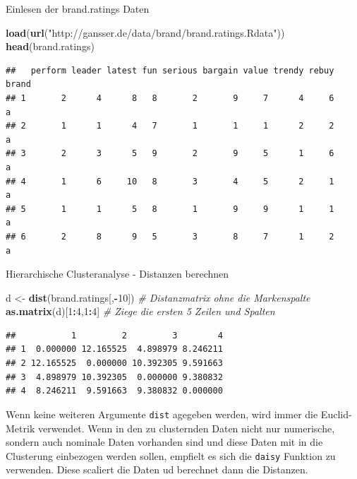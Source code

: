\documentclass[12pt,ngerman,a4paper,ignorenonframetext,]{beamer}
\newenvironment{Shaded}{\begin{snugshade}}{\end{snugshade}}
\newcommand{\CommentTok}[1]{\textcolor[rgb]{0.56,0.35,0.01}{\textit{#1}}}
\newcommand{\DecValTok}[1]{\textcolor[rgb]{0.00,0.00,0.81}{#1}}
\newcommand{\KeywordTok}[1]{\textcolor[rgb]{0.13,0.29,0.53}{\textbf{#1}}}
\newcommand{\NormalTok}[1]{#1}
\newcommand{\OperatorTok}[1]{\textcolor[rgb]{0.81,0.36,0.00}{\textbf{#1}}}
\newcommand{\StringTok}[1]{\textcolor[rgb]{0.31,0.60,0.02}{#1}}
\begin{document}
\begin{frame}{Einlesen der brand.ratings Daten}
\protect\hypertarget{einlesen-der-brand.ratings-daten}{}

\begin{Shaded}
\begin{Highlighting}[]
\KeywordTok{load}\NormalTok{(}\KeywordTok{url}\NormalTok{(}\StringTok{"http://gansser.de/data/brand/brand.ratings.Rdata"}\NormalTok{))}
\KeywordTok{head}\NormalTok{(brand.ratings)}
\end{Highlighting}
\end{Shaded}

\begin{verbatim}
##   perform leader latest fun serious bargain value trendy rebuy brand
## 1       2      4      8   8       2       9     7      4     6     a
## 2       1      1      4   7       1       1     1      2     2     a
## 3       2      3      5   9       2       9     5      1     6     a
## 4       1      6     10   8       3       4     5      2     1     a
## 5       1      1      5   8       1       9     9      1     1     a
## 6       2      8      9   5       3       8     7      1     2     a
\end{verbatim}

\end{frame}

\begin{frame}[fragile]{Hierarchische Clusteranalyse - Distanzen
berechnen}
\protect\hypertarget{hierarchische-clusteranalyse---distanzen-berechnen}{}

\begin{Shaded}
\begin{Highlighting}[]
\NormalTok{d <-}\StringTok{ }\KeywordTok{dist}\NormalTok{(brand.ratings[,}\OperatorTok{-}\DecValTok{10}\NormalTok{]) }\CommentTok{# Distanzmatrix ohne die Markenspalte}
\KeywordTok{as.matrix}\NormalTok{(d)[}\DecValTok{1}\OperatorTok{:}\DecValTok{4}\NormalTok{,}\DecValTok{1}\OperatorTok{:}\DecValTok{4}\NormalTok{] }\CommentTok{# Ziege die ersten 5 Zeilen und Spalten}
\end{Highlighting}
\end{Shaded}

\begin{verbatim}
##           1         2         3        4
## 1  0.000000 12.165525  4.898979 8.246211
## 2 12.165525  0.000000 10.392305 9.591663
## 3  4.898979 10.392305  0.000000 9.380832
## 4  8.246211  9.591663  9.380832 0.000000
\end{verbatim}

Wenn keine weiteren Argumente \texttt{dist} agegeben werden, wird immer
die Euclid-Metrik verwendet. Wenn in den zu clusternden Daten nicht nur
numerische, sondern auch nominale Daten vorhanden sind und diese Daten
mit in die Clusterung einbezogen werden sollen, empfielt es sich die
\texttt{daisy} Funktion zu verwenden. Diese scaliert die Daten ud
berechnet dann die Distanzen.

\end{frame}
\end{document}
